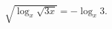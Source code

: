 \begin{ex}[type=equation]
	\begin{condition}
		$\sqrt{\log_x \sqrt{3x}} = -\log_x 3.$
	\end{condition}
\end{ex}